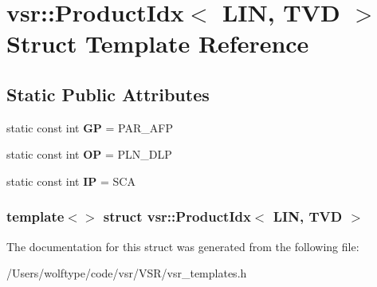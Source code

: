 \hypertarget{structvsr_1_1_product_idx_3_01_l_i_n_00_01_t_v_d_01_4}{\section{vsr\-:\-:Product\-Idx$<$ L\-I\-N, T\-V\-D $>$ Struct Template Reference}
\label{structvsr_1_1_product_idx_3_01_l_i_n_00_01_t_v_d_01_4}
}
\subsection*{Static Public Attributes}
\begin{DoxyCompactItemize}
\item 
\hypertarget{structvsr_1_1_product_idx_3_01_l_i_n_00_01_t_v_d_01_4_ac5a1625e14e22e10efca943a4365cc7d}{static const int {\bfseries G\-P} = P\-A\-R\-\_\-\-A\-F\-P}\label{structvsr_1_1_product_idx_3_01_l_i_n_00_01_t_v_d_01_4_ac5a1625e14e22e10efca943a4365cc7d}

\item 
\hypertarget{structvsr_1_1_product_idx_3_01_l_i_n_00_01_t_v_d_01_4_af5f101fdf807165e5e03e7f165a47caa}{static const int {\bfseries O\-P} = P\-L\-N\-\_\-\-D\-L\-P}\label{structvsr_1_1_product_idx_3_01_l_i_n_00_01_t_v_d_01_4_af5f101fdf807165e5e03e7f165a47caa}

\item 
\hypertarget{structvsr_1_1_product_idx_3_01_l_i_n_00_01_t_v_d_01_4_a321fd7966a8c5f03ba612c3db9a984c1}{static const int {\bfseries I\-P} = S\-C\-A}\label{structvsr_1_1_product_idx_3_01_l_i_n_00_01_t_v_d_01_4_a321fd7966a8c5f03ba612c3db9a984c1}

\end{DoxyCompactItemize}
\subsubsection*{template$<$$>$ struct vsr\-::\-Product\-Idx$<$ L\-I\-N, T\-V\-D $>$}



The documentation for this struct was generated from the following file\-:\begin{DoxyCompactItemize}
\item 
/\-Users/wolftype/code/vsr/\-V\-S\-R/vsr\-\_\-templates.\-h\end{DoxyCompactItemize}
